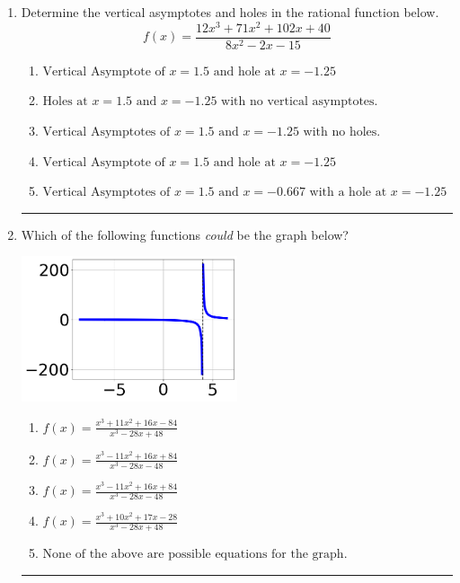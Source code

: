 \documentclass[14pt]{extbook}
\newcommand{\litem}[1]{\item#1\hspace*{-1cm}\rule{\textwidth}{0.4pt}}
\begin{document}
\begin{enumerate}
{\begin{enumerate}[label=\Alph*.]
\end{enumerate} }
\litem{
Determine the vertical asymptotes and holes in the rational function below.\[ f(x) = \frac{12x^{3} +71 x^{2} +102 x + 40}{8x^{2} -2 x -15} \]\begin{enumerate}[label=\Alph*.]
\item \( \text{Vertical Asymptote of } x = 1.5 \text{ and hole at } x = -1.25 \)
\item \( \text{Holes at } x = 1.5 \text{ and } x = -1.25 \text{ with no vertical asymptotes.} \)
\item \( \text{Vertical Asymptotes of } x = 1.5 \text{ and } x = -1.25 \text{ with no holes.} \)
\item \( \text{Vertical Asymptote of } x = 1.5 \text{ and hole at } x = -1.25 \)
\item \( \text{Vertical Asymptotes of } x = 1.5 \text{ and } x = -0.667 \text{ with a hole at } x = -1.25 \)

\end{enumerate} }
\litem{
Which of the following functions \textit{could} be the graph below?
\begin{center}
    \includegraphics[width=0.5\textwidth]{../Figures/identifyGraphOfRationalFunctionA.png}
\end{center}
\begin{enumerate}[label=\Alph*.]
\item \( f(x)=\frac{x^{3} +11 x^{2} +16 x -84}{x^{3} -28 x + 48} \)
\item \( f(x)=\frac{x^{3} -11 x^{2} +16 x + 84}{x^{3} -28 x -48} \)
\item \( f(x)=\frac{x^{3} -11 x^{2} +16 x + 84}{x^{3} -28 x -48} \)
\item \( f(x)=\frac{x^{3} +10 x^{2} +17 x -28}{x^{3} -28 x + 48} \)
\item \( \text{None of the above are possible equations for the graph.} \)


\end{enumerate}}
\end{enumerate}
\end{document}

